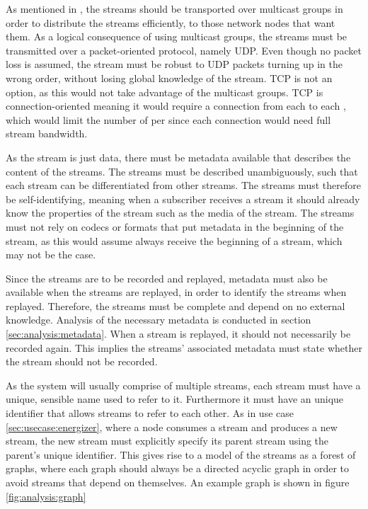 As mentioned in , the streams should be transported over multicast groups in order to distribute the streams efficiently, to those network nodes that want them. 
As a logical consequence of using multicast groups, the streams must be transmitted over a  packet-oriented protocol, namely UDP. Even though no packet loss is assumed, the stream must be robust to UDP packets turning up in the wrong order, without losing global knowledge of the stream. TCP is not an option, as this would not take advantage of the multicast groups. TCP is connection-oriented meaning it would require a connection from each  to each , which would limit the number of  per  since each connection would need full stream bandwidth.

As the stream is just data, there must be metadata available that describes the content of the streams. The streams must be described unambiguously, such that each stream can be differentiated from other streams. The streams must therefore be self-identifying, meaning when a subscriber receives a stream it should already know the properties of the stream such as the media of the stream. The streams must not rely on codecs or formats that put metadata in the beginning of the stream, as this would assume  always receive the beginning of a stream, which may not be the case.

Since the streams are to be recorded and replayed, metadata must also be available when the streams are replayed, in order to identify the streams when replayed. Therefore, the streams must be complete and depend on no external knowledge. Analysis of the necessary metadata is conducted in section \ref{sec:analysis:metadata}. When a stream is replayed, it should not necessarily be recorded again. This implies the streams' associated metadata must state whether the stream should not be recorded.

As the system will usually comprise of multiple streams, each stream must have a unique, sensible name used to refer to it. Furthermore it must have an unique identifier that allows streams to refer to each other.
As in use case \ref{sec:usecase:energizer}, where a node consumes a stream and produces a new stream, the new stream must explicitly specify its parent stream using the parent's unique identifier. This gives rise to a model of the streams as a forest of graphs, where each graph should always be a directed acyclic graph in order to avoid streams that depend on themselves. An example graph is shown in figure \ref{fig:analysis:graph}

